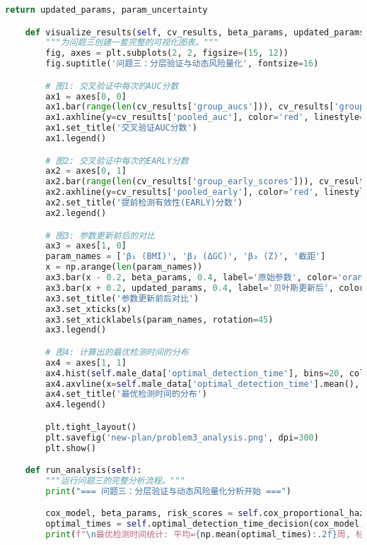 \documentclass[UTF8, a4paper, 11pt]{ctexart}
\begin{document}
\begin{lstlisting}[language=Python, caption={问题三的解决方案脚本。}]
        return updated_params, param_uncertainty

    def visualize_results(self, cv_results, beta_params, updated_params):
        """为问题三创建一套完整的可视化图表。"""
        fig, axes = plt.subplots(2, 2, figsize=(15, 12))
        fig.suptitle('问题三：分层验证与动态风险量化', fontsize=16)

        # 图1: 交叉验证中每次的AUC分数
        ax1 = axes[0, 0]
        ax1.bar(range(len(cv_results['group_aucs'])), cv_results['group_aucs'], color='lightblue', edgecolor='black')
        ax1.axhline(y=cv_results['pooled_auc'], color='red', linestyle='--', label=f"平均AUC: {cv_results['pooled_auc']:.3f}")
        ax1.set_title('交叉验证AUC分数')
        ax1.legend()

        # 图2: 交叉验证中每次的EARLY分数
        ax2 = axes[0, 1]
        ax2.bar(range(len(cv_results['group_early_scores'])), cv_results['group_early_scores'], color='lightgreen', edgecolor='black')
        ax2.axhline(y=cv_results['pooled_early'], color='red', linestyle='--', label=f"平均EARLY: {cv_results['pooled_early']:.3f}")
        ax2.set_title('提前检测有效性(EARLY)分数')
        ax2.legend()

        # 图3: 参数更新前后的对比
        ax3 = axes[1, 0]
        param_names = ['β₁ (BMI)', 'β₂ (ΔGC)', 'β₃ (Z)', '截距']
        x = np.arange(len(param_names))
        ax3.bar(x - 0.2, beta_params, 0.4, label='原始参数', color='orange')
        ax3.bar(x + 0.2, updated_params, 0.4, label='贝叶斯更新后', color='purple')
        ax3.set_title('参数更新前后对比')
        ax3.set_xticks(x)
        ax3.set_xticklabels(param_names, rotation=45)
        ax3.legend()

        # 图4: 计算出的最优检测时间的分布
        ax4 = axes[1, 1]
        ax4.hist(self.male_data['optimal_detection_time'], bins=20, color='skyblue', edgecolor='black')
        ax4.axvline(x=self.male_data['optimal_detection_time'].mean(), color='red', linestyle='--', label=f"平均值: {self.male_data['optimal_detection_time'].mean():.1f} 周")
        ax4.set_title('最优检测时间的分布')
        ax4.legend()

        plt.tight_layout()
        plt.savefig('new-plan/problem3_analysis.png', dpi=300)
        plt.show()

    def run_analysis(self):
        """运行问题三的完整分析流程。"""
        print("=== 问题三：分层验证与动态风险量化分析开始 ===")

        cox_model, beta_params, risk_scores = self.cox_proportional_hazards_approximation()
        optimal_times = self.optimal_detection_time_decision(cox_model, beta_params)
        print(f"\n最优检测时间统计: 平均={np.mean(optimal_times):.2f}周, 标准差={np.std(optimal_times):.2f}周")


\end{lstlisting}
\end{document}
